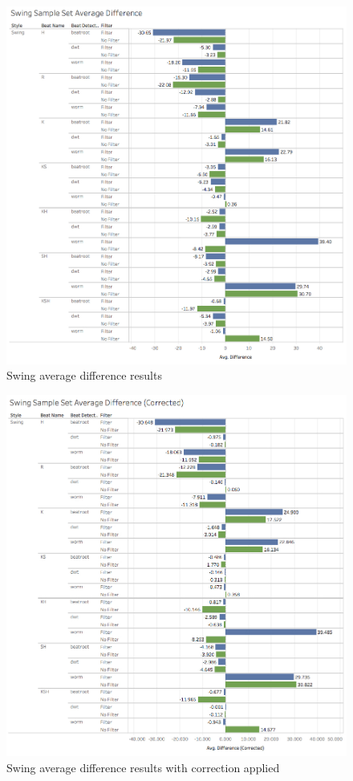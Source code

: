 \documentclass[a4paper, 11pt]{article}
\begin{document}
\begin{figure}[htbp]
\centering
\includegraphics[scale=0.45]{images/SwiSSAD.jpg}
\caption{Swing average difference results}
\label{fig: swingAveDiff}
\end{figure}

\begin{figure}[htbp]
\centering
\includegraphics[scale=0.45]{images/SwiSSADC.jpg}
\caption{Swing average difference results with correction applied}
\label{fig: swingAveDiffCor}
\end{figure}
\end{document}
